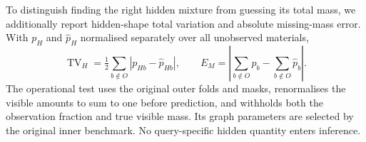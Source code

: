 To distinguish finding the right hidden mixture from guessing its total mass, we additionally report hidden-shape total variation and absolute missing-mass error. With $p_H$ and $\widehat p_H$ normalised separately over all unobserved materials,
\begin{equation}
\operatorname{TV}_H=\tfrac12\sum_{b\notin O}|p_{Hb}-\widehat p_{Hb}|,\qquad
E_M=\left|\sum_{b\notin O}p_b-\sum_{b\notin O}\widehat p_b\right|.
\label{eq:hidden-metrics}
\end{equation}
The operational test uses the original outer folds and masks, renormalises the visible amounts to sum to one before prediction, and withholds both the observation fraction and true visible mass. Its graph parameters are selected by the original inner benchmark. No query-specific hidden quantity enters inference.
